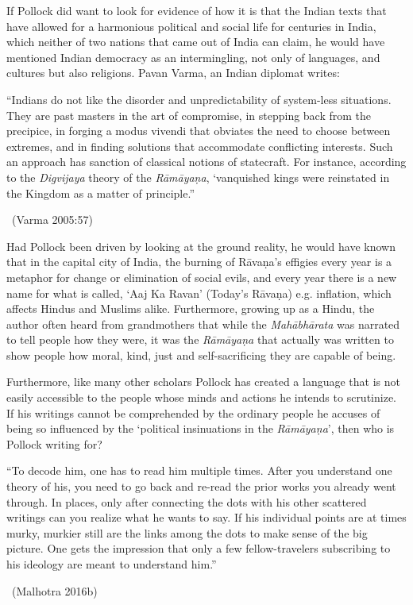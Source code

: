 If Pollock did want to look for evidence of how it is that the Indian texts that have allowed for a harmonious political and social life for centuries in India, which neither of two nations that came out of India can claim, he would have mentioned Indian democracy as an intermingling, not only of languages, and cultures but also religions. Pavan Varma, an Indian diplomat writes:

\begin{myquote}
“Indians do not like the disorder and unpredictability of system-less situations. They are past masters in the art of compromise, in stepping back from the precipice, in forging a modus vivendi that obviates the need to choose between extremes, and in finding solutions that accommodate conflicting interests. Such an approach has sanction of classical notions of statecraft. For instance, according to the \textit{Digvijaya} theory of the \textit{Rāmāyaṇa}, ‘vanquished kings were reinstated in the Kingdom as a matter of principle.” 

\vskip -5pt

~\hfill (Varma 2005:57)
\end{myquote}

Had Pollock been driven by looking at the ground reality, he would have known that in the capital city of India, the burning of Rāvaṇa’s effigies every year is a metaphor for change or elimination of social evils, and every year there is a new name for what is called, ‘Aaj Ka Ravan’ (Today’s Rāvaṇa) e.g. inflation, which affects Hindus and Muslims alike. Furthermore, growing up as a Hindu, the author often heard from grandmothers that while the \textit{Mahābhārata} was narrated to tell people how they were, it was the \textit{Rāmāyaṇa} that actually was written to show people how moral, kind, just and self-sacrificing they are capable of being.

Furthermore, like many other scholars Pollock has created a language that is not easily accessible to the people whose minds and actions he intends to scrutinize. If his writings cannot be comprehended by the ordinary people he accuses of being so influenced by the ‘political insinuations in the \textit{Rāmāyaṇa}’, then who is Pollock writing for?

\begin{myquote}
“To decode him, one has to read him multiple times. After you understand one theory of his, you need to go back and re-read the prior works you already went through. In places, only after connecting the dots with his other scattered writings can you realize what he wants to say. If his individual points are at times murky, murkier still are the links among the dots to make sense of the big picture. One gets the impression that only a few fellow-travelers subscribing to his ideology are meant to understand him.” 

\vskip -5pt

~\hfill (Malhotra 2016b)
\end{myquote}

